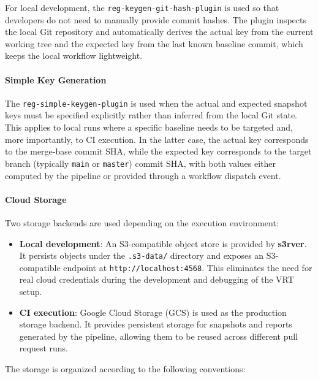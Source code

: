 For local development, the \texttt{reg-keygen-git-hash-plugin} is used so that developers do not need to manually provide commit hashes. The plugin inspects the local Git repository and automatically derives the actual key from the current working tree and the expected key from the last known baseline commit, which keeps the local workflow lightweight.

\paragraph{Simple Key Generation}

The \texttt{reg-simple-keygen-plugin} is used when the actual and expected snapshot keys must be specified explicitly rather than inferred from the local Git state. This applies to local runs where a specific baseline needs to be targeted and, more importantly, to \ac{CI} execution. In the latter case, the actual key corresponds to the merge-base commit \ac{SHA}, while the expected key corresponds to the target branch (typically \texttt{main} or \texttt{master}) commit \ac{SHA}, with both values either computed by the pipeline or provided through a workflow dispatch event.

\paragraph{Cloud Storage}

Two storage backends are used depending on the execution environment:

\begin{itemize}
    \item \textbf{Local development}: An S3-compatible object store is provided by \textbf{s3rver}. It persists objects under the \texttt{.s3-data/} directory and exposes an S3-compatible endpoint at \texttt{http://localhost:4568}. This eliminates the need for real cloud credentials during the development and debugging of the \ac{VRT} setup.

    \item \textbf{\ac{CI} execution}: Google Cloud Storage (\ac{GCS}) is used as the production storage backend. It provides persistent storage for snapshots and reports generated by the pipeline, allowing them to be reused across different pull request runs.
\end{itemize}

The storage is organized according to the following conventions:

